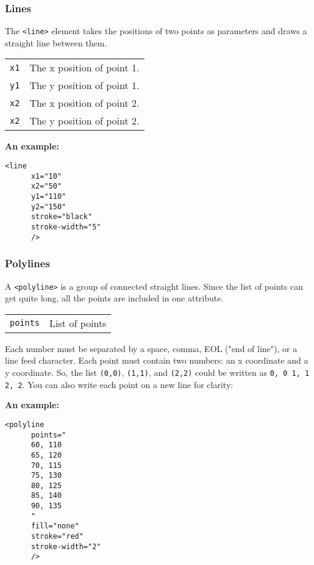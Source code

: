 \documentclass[english,11pt,a4paper]{report}
\begin{document}
\newpage
\subsubsection{Lines}
The \verb|<line>| element takes the positions of two points as parameters and draws a straight line between them.
\begin{center}
\begin{tabular}{l|p{15cm}}
\verb|x1| & The x position of  point 1. \\
\verb|y1| & The y position of  point 1. \\
\verb|x2| & The x position of  point 2. \\
\verb|x2| & The y position of  point 2. 
\end{tabular}
\end{center}

{\bf An example:}
\begin{multicols}{2}
\begin{lstlisting}
<line 
      x1="10" 
      x2="50" 
      y1="110" 
      y2="150" 
      stroke="black" 
      stroke-width="5"
      />
\end{lstlisting}
\columnbreak

\end{multicols}

\newpage
\subsubsection{Polylines}
A \verb|<polyline>| is a group of connected straight lines. Since the list of points can get quite long, all the points are included in one attribute.
\begin{center}
\begin{tabular}{l|p{15cm}}
\verb|points| & List of points
\end{tabular}
\end{center}

Each number must be separated by a space, comma, EOL ("end of line"), or a line feed character. Each point must contain two numbers: an x coordinate and a y coordinate. So, the list \verb|(0,0)|, \verb|(1,1)|, and \verb|(2,2)| could be written as \verb|0, 0 1, 1 2, 2|. You can also write each point on a new line for clarity:

{\bf An example:}
\begin{multicols}{2}
\begin{lstlisting}
<polyline 
      points="
      60, 110 
      65, 120 
      70, 115 
      75, 130 
      80, 125 
      85, 140 
      90, 135 
      "
      fill="none"
      stroke="red"
      stroke-width="2"
      />
\end{lstlisting}
\columnbreak

\end{multicols}
\end{document}
